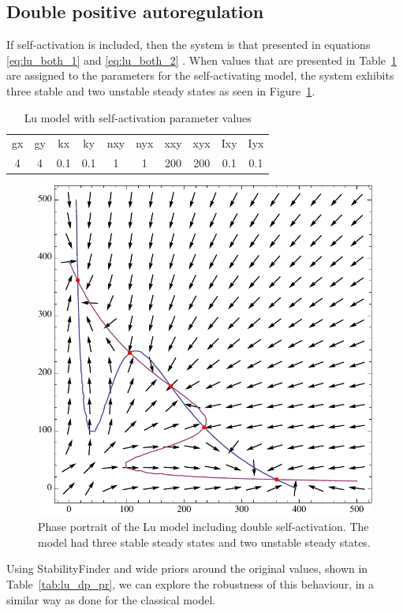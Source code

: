 \subsection{Double positive autoregulation}
If self-activation is included, then the system is that presented in equations \ref{eq:lu_both_1} and \ref{eq:lu_both_2} . When values that are presented in Table~\ref{tab:lu_dp_tri} are assigned to the parameters for the self-activating model, the system exhibits three stable and two unstable steady states as seen in Figure~\ref{fig:lu_tri_phse}. 

\begin{table}[h]
\centering
\caption{Lu model with self-activation parameter values}
\label{tab:lu_dp_tri}
\begin{tabular}{cccccccccc}
gx    & gy    & kx    & ky    & nxy & nyx & xxy     & xyx     & Ixy   & Iyx \\
4&4     &0.1   & 0.1   &  1  &  1  &  200    &  200    & 0.1    &   0.1
\end{tabular}
\end{table}

\begin{figure}[h]
\centering
\includegraphics[scale=0.7]{chapterModelling/Lu_switches/images/Lu/mae/selfactivation.pdf}
\caption[Phase portrait of the Lu model including double self-activation]{Phase portrait of the Lu model including double self-activation. The model had three stable steady states and two unstable steady states.}
\label{fig:lu_tri_phse}
\end{figure}
\clearpage
Using StabilityFinder and wide priors around the original values, shown in Table~\ref{tab:lu_dp_pr}, we can explore the robustness of this behaviour, in a similar way as done for the classical model. 

